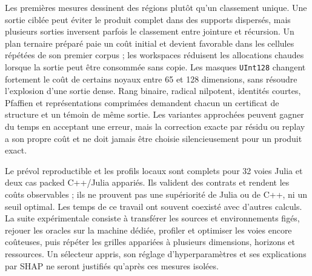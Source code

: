 \documentclass[11pt,a4paper]{article}
\newcommand{\code}[1]{\texttt{#1}}
\begin{document}
Les premières mesures dessinent des régions plutôt qu'un classement
unique. Une sortie ciblée peut éviter le produit complet dans des
supports dispersés, mais plusieurs sorties inversent parfois le
classement entre jointure et récursion. Un plan ternaire préparé paie
un coût initial et devient favorable dans les cellules répétées de
son premier corpus ; les workspaces réduisent les allocations chaudes
lorsque la sortie peut être consommée sans copie. Les masques
\code{UInt128} changent fortement le coût de certains noyaux entre
65 et 128 dimensions, sans résoudre l'explosion d'une sortie dense.
Rang binaire, radical nilpotent, identités courtes, Pfaffien et
représentations comprimées demandent chacun un certificat de structure
et un témoin de même sortie. Les variantes approchées peuvent gagner
du temps en acceptant une erreur, mais la correction exacte par
résidu ou replay a son propre coût et ne doit jamais être choisie
silencieusement pour un produit exact.

Le prévol reproductible et les profils locaux sont complets pour
32 voies Julia et deux cas packed C++/Julia appariés. Ils valident
des contrats et rendent les coûts observables ; ils ne prouvent
pas une supériorité de Julia ou de C++, ni un seuil optimal.
Les temps de ce travail ont souvent coexisté avec d'autres calculs.
La suite expérimentale consiste à transférer les sources et
environnements figés, rejouer les oracles sur la machine dédiée,
profiler et optimiser les voies encore coûteuses, puis répéter les
grilles appariées à plusieurs dimensions, horizons et ressources.
Un sélecteur appris, son réglage d'hyperparamètres et ses explications
par SHAP ne seront justifiés qu'après ces mesures isolées.
\end{document}
